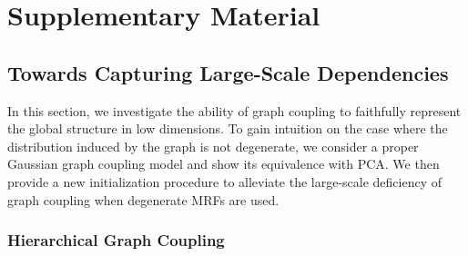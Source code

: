 
\section{Supplementary Material}\label{sec:supp_material_gc}

\subsection{Towards Capturing Large-Scale Dependencies}\label{sec:towards_large_scale}

In this section, we investigate the ability of graph coupling to faithfully represent the global structure in low dimensions. To gain intuition on the case where the distribution induced by the graph is not degenerate, we consider a proper Gaussian graph coupling model and show its equivalence with PCA. We then provide a new initialization procedure to alleviate the large-scale deficiency of graph coupling when degenerate MRFs are used.

\subsubsection{Hierarchical Graph Coupling}\label{sec:hierarchical_modelling}


